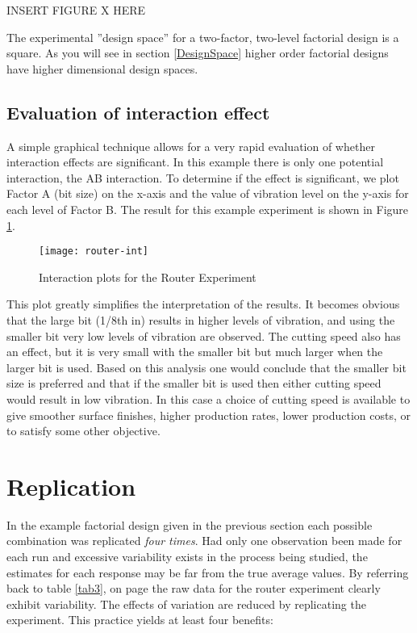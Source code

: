 INSERT FIGURE X HERE\label{2facspace}


The experimental ''design space'' for a two-factor, two-level factorial design is a square.  As you will see in  section \ref{DesignSpace} higher order factorial designs have higher dimensional design spaces.

\subsection{Evaluation of interaction effect}
A simple graphical technique allows for a very rapid evaluation of whether interaction effects are significant.  In this example there is only one potential interaction, the AB interaction.  To determine if the effect is significant, we plot Factor A (bit size) on the x-axis and the value of vibration level on the y-axis for each level of Factor B.  The result for this example experiment is shown in Figure \ref{fig4}.
\begin{figure}[h]\caption{Interaction plots for the Router Experiment}\label{fig4}
\begin{center}
\texttt{[image: router-int]}
\end{center}
\end{figure}

This plot greatly simplifies the interpretation of the results.  It becomes obvious that the large bit (1/8th in) results in higher levels of vibration, and using the smaller bit very low levels of vibration are observed.  The cutting speed also has an effect, but it is very small with the smaller bit but much larger when the larger bit is used.  Based on this analysis one would conclude that the smaller bit size is preferred and that if the smaller bit is used then either cutting speed would result in low vibration.  In this case a choice of cutting speed is available to give smoother surface finishes, higher production rates, lower production costs, or to satisfy some other objective.


\section{Replication}
In the example factorial design given in the previous section each possible combination was replicated \textit{four times}. Had only one observation been made for each run and excessive variability exists in the process being studied, the estimates for each response may be far from the true average values. By referring back to table \ref{tab3}, on page \pageref{tab3} the raw data for the router experiment clearly exhibit variability. The effects of variation are reduced by replicating the experiment.  This practice yields at least four benefits:

